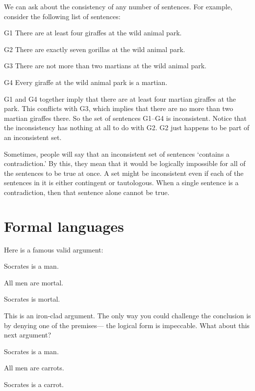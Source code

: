 We can ask about the consistency of any number of sentences. For example, consider the following list of sentences:
\label{MartianGiraffes}
\begin{ekey}
\item[G1] There are at least four giraffes at the wild animal park.
\item[G2] There are exactly seven gorillas at the wild animal park.
\item[G3] There are not more than two martians at the wild animal park.
\item[G4] Every giraffe at the wild animal park is a martian.
\end{ekey}
G1 and G4 together imply that there are at least four martian giraffes at the park. This conflicts with G3, which implies that there are no more than two martian giraffes there. So the set of sentences G1--G4 is inconsistent. Notice that the inconsistency has nothing at all to do with G2. G2 just happens to be part of an inconsistent set.

Sometimes, people will say that an inconsistent set of sentences `contains a contradiction.' By this, they mean that it would be logically impossible for all of the sentences to be true at once. A set might be inconsistent even if each of the sentences in it is either contingent or tautologous. When a single sentence is a contradiction, then that sentence alone cannot be true.



\section{Formal languages}

Here is a famous valid argument:
\begin{earg}
\item[] Socrates is a man.
\item[] All men are mortal.
\item[\therefore] Socrates is mortal.
\end{earg}
This is an iron-clad argument. The only way you could challenge the conclusion is by denying one of the premises--- the logical form is impeccable. What about this next argument?

\begin{earg}
\item[] Socrates is a man.
\item[] All men are carrots.
\item[\therefore] Socrates is a carrot.
\end{earg}

